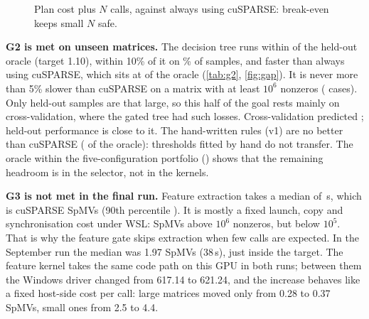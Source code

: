 \begin{figure}[t]
\centering
\begin{minipage}[t]{0.49\linewidth}\centering{}
\caption{Oracle gap on held-out samples: the CDF of $T_\text{selected}/T_\text{oracle}$.}\label{fig:gap}\end{minipage}\hfill
\begin{minipage}[t]{0.49\linewidth}\centering{}
\caption{Plan cost plus $N$ calls, against always using cuSPARSE: break-even keeps small $N$ safe.}\label{fig:sweep}\end{minipage}
\end{figure}

\textbf{G2 is met on unseen matrices.} The decision tree runs within \x{} of the held-out oracle
(target 1.10), within 10\% of it on \% of samples, and \x{}
faster than always using cuSPARSE, which sits at \x{} of the oracle (\cref{tab:g2},
\cref{fig:gap}). It is never more than 5\% slower than cuSPARSE on a matrix with at least $10^6$ nonzeros
( cases). Only  held-out samples are that large, so this half of
the goal rests mainly on cross-validation, where the gated tree had  such losses.
Cross-validation predicted ; held-out performance is close to it. The hand-written rules (v1) are no
better than cuSPARSE (\x{} of the oracle): thresholds fitted by hand do not transfer. The oracle
within the five-configuration portfolio (\x) shows that the remaining headroom is in the
selector, not in the kernels.

\textbf{G3 is not met in the final run.} Feature extraction takes a median of \,\textmu s, which is
 cuSPARSE SpMVs (90th percentile ). It is mostly a fixed launch, copy and
synchronisation cost under WSL:  SpMVs above $10^6$ nonzeros, but 
below $10^5$. That is why the feature gate skips extraction when few calls are expected. In the September run the
median was 1.97 SpMVs (38\,\textmu s), just inside the target. The feature kernel takes the same code path on this GPU in
both runs; between them the Windows driver changed from 617.14 to 621.24, and the increase behaves like a fixed
host-side cost per call: large matrices moved only from 0.28 to 0.37 SpMVs, small ones from 2.5 to 4.4.

